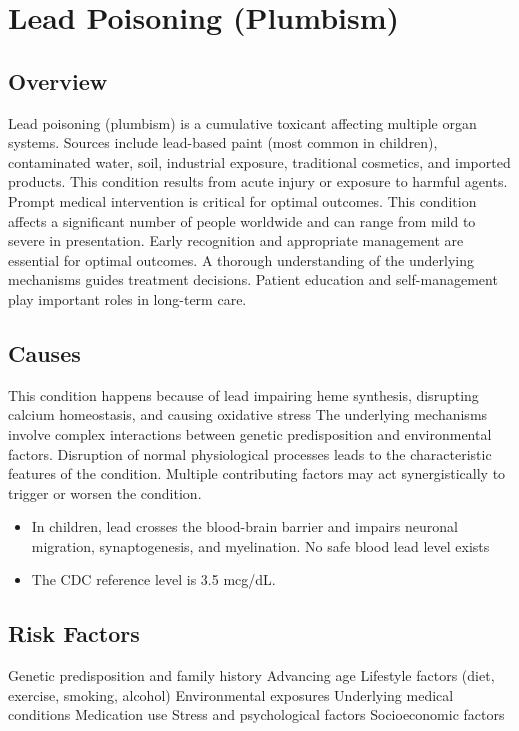 \chapter{Lead Poisoning (Plumbism)}
\label{sec:Lead Poisoning}

\section{Overview}
Lead poisoning (plumbism) is a cumulative toxicant affecting multiple organ systems. Sources include lead-based paint (most common in children), contaminated water, soil, industrial exposure, traditional cosmetics, and imported products. This condition results from acute injury or exposure to harmful agents. Prompt medical intervention is critical for optimal outcomes. This condition affects a significant number of people worldwide and can range from mild to severe in presentation. Early recognition and appropriate management are essential for optimal outcomes. A thorough understanding of the underlying mechanisms guides treatment decisions. Patient education and self-management play important roles in long-term care.
\section{Causes}
This condition happens because of lead impairing heme synthesis, disrupting calcium homeostasis, and causing oxidative stress The underlying mechanisms involve complex interactions between genetic predisposition and environmental factors. Disruption of normal physiological processes leads to the characteristic features of the condition. Multiple contributing factors may act synergistically to trigger or worsen the condition.

\begin{itemize}[noitemsep]
  \item In children, lead crosses the blood-brain barrier and impairs neuronal migration, synaptogenesis, and myelination. No safe blood lead level exists
  \item The CDC reference level is 3.5 mcg/dL.
\end{itemize}
\section{Risk Factors}
Genetic predisposition and family history Advancing age Lifestyle factors (diet, exercise, smoking, alcohol) Environmental exposures Underlying medical conditions Medication use Stress and psychological factors Socioeconomic factors

